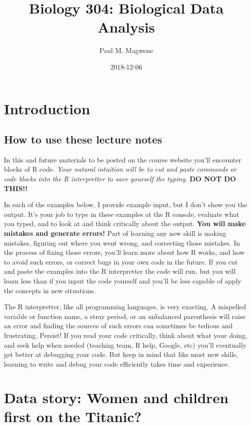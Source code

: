 \documentclass[]{book}
\title{Biology 304: Biological Data Analysis}
\author{Paul M. Magwene}
\date{2018-12-06}
\theoremstyle{definition}
\theoremstyle{definition}
\theoremstyle{definition}
\theoremstyle{remark}
\begin{document}
\maketitle

{
\setcounter{tocdepth}{1}
\tableofcontents
}
\hypertarget{introduction}{%
\chapter{Introduction}\label{introduction}}

\hypertarget{how-to-use-these-lecture-notes}{%
\section{How to use these lecture
notes}\label{how-to-use-these-lecture-notes}}

In this and future materials to be posted on the course website you'll
encounter blocks of R code. \emph{Your natural intuition will be to cut
and paste commands or code blocks into the R interpretter to save
yourself the typing.} \textbf{DO NOT DO THIS!!}

In each of the examples below, I provide example input, but I don't show
you the output. It's your job to type in these examples at the R
console, evaluate what you typed, and to look at and think critically
about the output. \textbf{You will make mistakes and generate errors!}
Part of learning any new skill is making mistakes, figuring out where
you went wrong, and correcting those mistakes. In the process of fixing
those errors, you'll learn more about how R works, and how to avoid such
errors, or correct bugs in your own code in the future. If you cut and
paste the examples into the R interpretter the code will run, but you
will learn less than if you input the code yourself and you'll be less
capable of apply the concepts in new situations.

The R interpretter, like all programming languages, is very exacting. A
mispelled variable or function name, a stray period, or an unbalanced
parenthesis will raise an error and finding the sources of such errors
can sometimes be tedious and frustrating. Persist! If you read your code
critically, think about what your doing, and seek help when needed
(teaching team, R help, Google, etc) you'll eventually get better at
debugging your code. But keep in mind that like most new skills,
learning to write and debug your code efficiently takes time and
experience.

\hypertarget{data-story-women-and-children-first-on-the-titanic}{%
\chapter{Data story: Women and children first on the
Titanic?}\label{data-story-women-and-children-first-on-the-titanic}}
\end{document}
